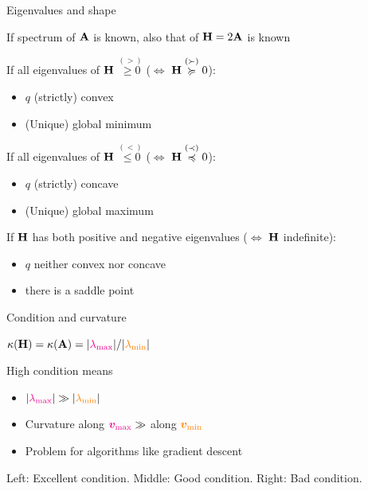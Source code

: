 \documentclass[11pt,compress,t,notes=noshow, xcolor=table]{beamer}
\begin{document}
\begin{framei}{Eigenvalues and shape}
\item If spectrum of $\mathbf{A}$ is known, also that of $\mathbf{H} = 2\mathbf{A}$ is known
\item If all eigenvalues of $\mathbf{H}$ $\overset{(>)}{\ge 0}$ ($\Leftrightarrow$ $\mathbf{H} \overset{(\succ)}{\succcurlyeq} 0$):
\begin{itemize}
\item $q$ (strictly) convex
\item (Unique) global minimum
\end{itemize}
\item If all eigenvalues of $\mathbf{H}$ $\overset{(<)}{\le 0}$ ($\Leftrightarrow$ $\mathbf{H} \overset{(\prec)}{\preccurlyeq} 0$):
\begin{itemize}
\item $q$ (strictly) concave
\item (Unique) global maximum
\end{itemize}
\item If $\mathbf{H}$ has both positive and negative eigenvalues ($\Leftrightarrow$ $\mathbf{H}$ indefinite):
\begin{itemize}
\item $q$ neither convex nor concave
\item there is a saddle point
\end{itemize}
\end{framei}


\begin{framei}{Condition and curvature}
\item $\kappa(\mathbf{H}) = \kappa(\mathbf{A}) = |\textcolor{magenta}{\lambda_\text{max}}| / |\textcolor{orange}{\lambda_\text{min}}|$
\item High condition means
\begin{itemize}
\item $|\textcolor{magenta}{\lambda_\text{max}}| \gg |\textcolor{orange}{\lambda_\text{min}}|$
\item Curvature along $\textcolor{magenta}{\bm{v}_\text{max}} \gg$ along $\textcolor{orange}{\bm{v}_\text{min}}$
\item Problem for algorithms like gradient descent
\end{itemize}
\begin{center}\begin{footnotesize} Left: Excellent condition. Middle: Good condition. Right: Bad condition.\end{footnotesize}\end{center}
\end{framei}
\end{document}
